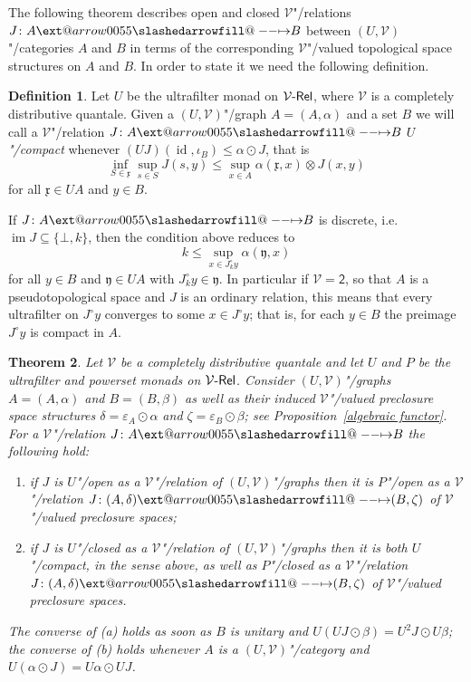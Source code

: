 \documentclass[preprint, a4paper]{elsarticle}
\makeatletter
\def\slashedarrowfill@#1#2#3#4#5{%
  $\m@th\thickmuskip0mu\medmuskip\thickmuskip\thinmuskip\thickmuskip
   \relax#5#1\mkern-7mu%
   \cleaders\hbox{$#5\mkern-2mu#2\mkern-2mu$}\hfill
   \mathclap{#3}\mathclap{#2}%
   \cleaders\hbox{$#5\mkern-2mu#2\mkern-2mu$}\hfill
   \mkern-7mu#4$%
}
\def\rightslashedarrowfill@{%
  \slashedarrowfill@\relbar\relbar\mapstochar\rightarrow}
\newcommand\xslashedrightarrow[2][]{%
  \ext@arrow 0055{\rightslashedarrowfill@}{#1}{#2}}
\def\slashedrightarrow{\xslashedrightarrow{}}
\newtheorem{theorem}{Theorem}[section]
\theoremstyle{definition}
\newtheorem{definition}[theorem]{Definition}
\theoremstyle{remark}
\providecommand{\propref}[1]{Proposition~\ref{#1}}
\providecommand{\eps}{\varepsilon}
\providecommand{\tens}{\otimes}
\providecommand{\mf}[1]{\mathfrak{#1}}
\providecommand{\brcs}[1]{\lbrace #1 \rbrace}
\providecommand{\set}[1]{\brcs{#1}}
\providecommand{\rev}[1]{#1^\circ}
\providecommand{\hmap}[3]{#1\colon#2\slashedrightarrow#3}
\DeclareMathOperator{\im}{im}
\DeclareMathOperator{\id}{id}
\providecommand{\catvar}[1]{\mathcal{#1}}
\providecommand{\2}{\mathsf 2}
\providecommand{\V}{\catvar V}
\providecommand{\Rel}{\mathsf{Rel}}
\providecommand{\enRel}[1]{#1\text-\Rel}
\providecommand{\hc}{\odot}
\makeatother
\begin{document}
	The following theorem describes open and closed $\V$"/relations $\hmap JAB$ between $(U, \V)$"/categories $A$ and $B$ in terms of the corresponding $\V$"/valued topological space structures on $A$ and $B$. In order to state it we need the following definition.
	\begin{definition} \label{U-compact}
		Let $U$ be the ultrafilter monad on $\enRel\V$, where $\V$ is a completely distributive quantale. Given a $(U, \V)$"/graph $A = (A, \alpha)$ and a set $B$ we will call a $\V$"/relation $\hmap JAB$ \emph{$U$"/compact} whenever $(UJ)(\id, \iota_B) \leq \alpha \hc J$, that is
	\begin{displaymath}
		\inf_{S \in \mf x} \sup_{s \in S} J(s, y) \leq \sup_{x \in A} \alpha(\mf x, x) \tens J(x, y)
	\end{displaymath}
	for all $\mf x \in UA$ and $y \in B$.
	\end{definition}
	If $\hmap JAB$ is discrete, i.e.\ $\im J \subseteq \set{\bot, k}$, then the condition above reduces to
	\begin{displaymath}
		k \leq \sup_{x \in \rev J_k y} \alpha(\mf y, x)
	\end{displaymath}
	for all $y \in B$ and $\mf y \in UA$ with $\rev J_k y \in \mf y$. In particular if $\V = \2$, so that $A$ is a pseudotopological space and $J$ is an ordinary relation, this means that every ultrafilter on $\rev Jy$ converges to some $x \in \rev Jy$; that is, for each $y \in B$ the preimage $\rev Jy$ is compact in $A$.
	\begin{theorem} \label{P and U horizontal morphism}
		Let $\V$ be a completely distributive quantale and let $U$ and $P$ be the ultrafilter and powerset monads on $\enRel\V$. Consider $(U, \V)$"/graphs $A = (A, \alpha)$ and $B = (B, \beta)$ as well as their induced $\V$"/valued preclosure space structures $\delta = \eps_A \hc \alpha$ and $\zeta = \eps_B \hc \beta$; see \propref{algebraic functor}. For a $\V$"/relation $\hmap JAB$ the following hold:
		\begin{enumerate}[label=\textup{(\alph*)}]
			\item if $J$ is $U$"/open as a $\V$"/relation of $(U, \V)$"/graphs then it is $P$"/open as a $\V$"/relation $\hmap J{(A, \delta)}{(B, \zeta)}$ of $\V$"/valued preclosure spaces;
			\item if $J$ is $U$"/closed as a $\V$"/relation of $(U, \V)$"/graphs then it is both $U$"/compact, in the sense above, as well as $P$"/closed as a $\V$"/relation $\hmap J{(A, \delta)}{(B, \zeta)}$ of $\V$"/valued preclosure spaces.
		\end{enumerate}
		The converse of \textup{(a)} holds as soon as $B$ is unitary and $U(UJ \hc \beta) = U^2J \hc U\beta$; the converse of \textup{(b)} holds whenever $A$ is a $(U, \V)$"/category and $U(\alpha \hc J) = U\alpha \hc UJ$.
	\end{theorem}
\end{document}
